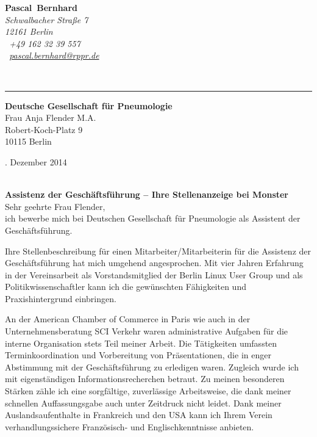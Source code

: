 \documentclass[11pt,a4paper]{article}
\def\firstname{Pascal}
\def\familyname{Bernhard}
\begin{document}
\sffamily   %
\hfill%
\begin{minipage}[t]{.6\textwidth}
	\raggedleft%
	{\bfseries {\color{firstnamecolor}\firstname}~{\color{familynamecolor}\familyname}}\\[.35ex]
	\small\itshape%
	Schwalbacher Straße 7\\
	12161 Berlin\\[.35ex]
	\Mobilefone~+49 162 32 39 557 \\
	\Letter~\href{mailto:pascal.bernhard@rppr.de}{pascal.bernhard@rppr.de}
\end{minipage}\\[0.5em]
%
{\color{firstnamecolor}\rule{\textwidth}{.25ex}}
%
\begin{minipage}[t]{.4\textwidth}
	\raggedright%
	\vspace*{1em}
	\textbf{Deutsche Gesellschaft für Pneumologie} \\
	Frau Anja Flender M.A.\\[.35ex]
	\small%
	Robert-Koch-Platz 9\\
	10115 Berlin
\end{minipage}
%
\hfill
%
\begin{minipage}[t]{.4\textwidth}
	. Dezember 2014
\end{minipage}\\[1em]


{\bfseries \color{familynamecolor}Assistenz der Geschäftsführung -- Ihre Stellenanzeige bei Monster}\\[0.75em]

Sehr geehrte Frau Flender,\\[0.5em]
%
ich bewerbe mich bei Deutschen Gesellschaft für Pneumologie als Assistent der Geschäftsführung.

Ihre Stellenbeschreibung für einen Mitarbeiter/Mitarbeiterin für die Assistenz der Geschäftsführung hat mich umgehend angesprochen. Mit vier Jahren Erfahrung in der Vereinsarbeit als Vorstandsmitglied der Berlin Linux User Group und als Politikwissenschaftler kann ich die gewünschten Fähigkeiten und Praxishintergrund einbringen.

An der American Chamber of Commerce in Paris wie auch in der Unternehmensberatung SCI Verkehr waren administrative Aufgaben für die interne Organisation stets Teil meiner Arbeit. Die Tätigkeiten umfassten Terminkoordination und Vorbereitung von Präsentationen, die in enger Abstimmung mit der Geschäftsführung zu erledigen waren. Zugleich wurde ich mit eigenständigen Informationsrecherchen betraut. Zu meinen besonderen Stärken zähle ich eine sorgfältige, zuverlässige Arbeitsweise, die dank meiner schnellen Auffassungsgabe auch unter Zeitdruck nicht leidet. Dank meiner Auslandsaufenthalte in Frankreich und den USA kann ich Ihrem Verein verhandlungssichere Französisch- und Englischkenntnisse anbieten.
\end{document}
